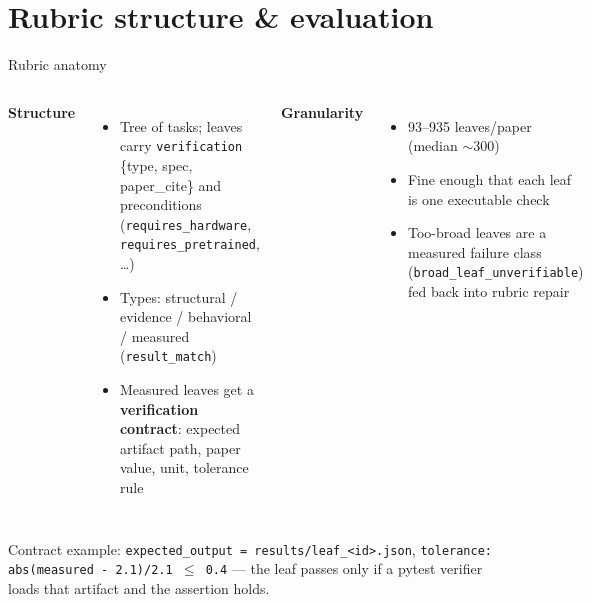 \documentclass[aspectratio=169]{beamer}
\begin{document}
\section{Rubric structure \& evaluation}

\begin{frame}{Rubric anatomy}
  \begin{columns}[T]
      \textbf{Structure}
      \begin{itemize}
        \item Tree of tasks; leaves carry \texttt{verification} \{type, spec, paper\_cite\}
              and preconditions (\texttt{requires\_hardware}, \texttt{requires\_pretrained}, \dots)
        \item Types: structural / evidence / behavioral / measured (\texttt{result\_match})
        \item Measured leaves get a \textbf{verification contract}: expected artifact path,
              paper value, unit, tolerance rule
      \end{itemize}
      \textbf{Granularity}
      \begin{itemize}
        \item 93--935 leaves/paper (median $\sim$300)
        \item Fine enough that each leaf is one executable check
        \item Too-broad leaves are a measured failure class
              (\texttt{broad\_leaf\_unverifiable}) fed back into rubric repair
      \end{itemize}
  \end{columns}
  \vfill
  \footnotesize
  Contract example: \texttt{expected\_output = results/leaf\_<id>.json},
  \texttt{tolerance: abs(measured - 2.1)/2.1 $\le$ 0.4} --- the leaf passes only if a
  pytest verifier loads that artifact and the assertion holds.
\end{frame}
\end{document}

